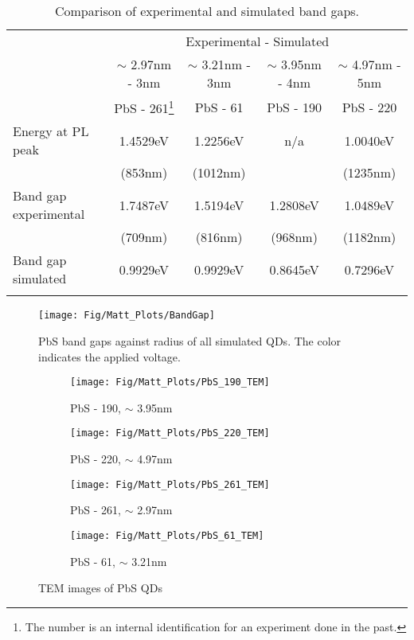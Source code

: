 	\begin{table}[htbp]
		\centering
		\begin{tabularx}{\textwidth}{Xc|c|c|c}
															& \multicolumn{4}{c}{Experimental \diameter - Simulated \diameter}														\\
															&	$\sim$ 2.97nm	- 3nm		&	$\sim$ 3.21nm - 3nm &	$\sim$ 3.95nm	-	4nm		&	$\sim$ 4.97nm - 5nm		\\
															&	PbS - 261\footnote{The number is an internal identification for an experiment done in the past.}	& PbS - 61						&	PbS - 190							&	PbS - 220							\\
			\hline
			Energy at \gls{PL} peak	&	1.4529eV 							&	1.2256eV 						&	n/a										&	1.0040eV 							\\
															&	(853nm)								&	(1012nm)						&												&	(1235nm)							\\
			Band gap experimental		&	1.7487eV 							&	1.5194eV 						&	1.2808eV 							&	1.0489eV 							\\
															&	(709nm)								&	(816nm)							&	(968nm)								&	(1182nm)							\\
			Band gap simulated			&	0.9929eV							&	0.9929eV						&	0.8645eV							&	0.7296eV							\\ \\
		\end{tabularx}
		\caption{Comparison of experimental and simulated band gaps.}
		\label{tbl:BandGap}
	\end{table}
	
	\begin{figure}[t]
		\texttt{[image: Fig/Matt\_Plots/BandGap]}
		\caption{PbS band gaps against radius of all simulated \glspl{QD}. The color indicates the applied voltage.}
		\label{fig:BandGap}
	\end{figure}
	
		\begin{figure}[htpb]
		\centering
		\begin{subfigure}{0.23\textwidth}
			\texttt{[image: Fig/Matt\_Plots/PbS\_190\_TEM]}
			\caption{PbS - 190, \diameter $\sim$ 3.95nm}
		\end{subfigure}
		\hfill   
		\begin{subfigure}{0.23\textwidth}
			\texttt{[image: Fig/Matt\_Plots/PbS\_220\_TEM]}
			\caption{PbS - 220, \diameter $\sim$ 4.97nm}
		\end{subfigure}
		\hfill
		\begin{subfigure}{0.23\textwidth}
			\texttt{[image: Fig/Matt\_Plots/PbS\_261\_TEM]}
			\caption{PbS - 261, \diameter $\sim$ 2.97nm}
		\end{subfigure}
		\hfill
		\begin{subfigure}{0.23\textwidth}
			\texttt{[image: Fig/Matt\_Plots/PbS\_61\_TEM]}
			\caption{PbS - 61, \diameter $\sim$ 3.21nm}
		\end{subfigure}
		\caption{\gls{TEM} images of PbS \glspl{QD}}
		\label{fig:PbS_TEM}	
	\end{figure}

